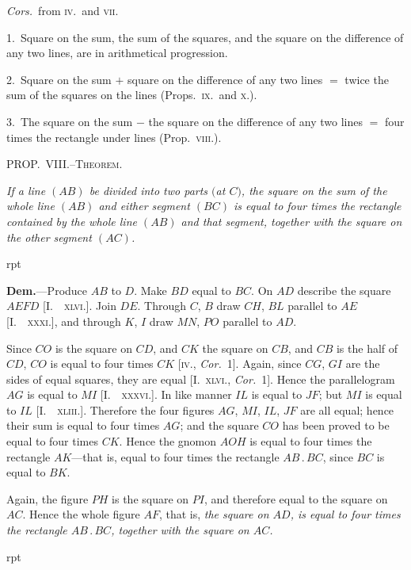 \documentclass[oneside]{book}
\newcounter{wrapwidth}
\newcommand\mypropl[2]{
\bigskip\Needspace*{4\baselineskip}\begin{center}\textsc{#1}\end{center}
\hspace{\parindent}\emph{#2}\par\medskip
}
\newcommand\imgflow[3]{
\setcounter{wrapwidth}{#1}

\begin{wrapfigure}[#2]{r}{\value{wrapwidth}pt}
\begin{center}
\vspace{-0.3in}

\end{center}
\end{wrapfigure}
}
\begin{document}
\textit{Cors.}\ from \textsc{iv}.\ and \textsc{vii}.

1.~Square on the sum, the sum of the squares, and
the square on the difference of any two lines, are in
arithmetical progression.

2.~Square on the sum $+$ square on the difference of
any two lines $=$ twice the sum of the squares on the
lines (Props.~\textsc{ix}.\ and \textsc{x}.).

3.~The square on the sum $-$ the square on the difference
of any two lines $=$ four times the rectangle under
lines (Prop.~\textsc{viii}.).



\mypropl{PROP\@.~VIII\@.--Theorem.}{If a line $(AB)$ be divided into two parts $($at $C)$, the
square on the sum of the whole line $(AB)$ and either segment
$(BC)$ is equal to four times the rectangle contained
by the whole line $(AB)$ and that segment, together with
the square on the other segment $(AC)$.}


\imgflow{110}{8}{f089}

\textbf{Dem.}---Produce $AB$ to $D$. Make $BD$ equal to $BC$.
On $AD$ describe the square $AEFD$
[I.~\textsc{~xlvi}.]. Join $DE$. Through
$C$, $B$ draw $CH$, $BL$ parallel to $AE$
[I.~\textsc{~xxxi}.], and through $K$, $I$ draw
$MN$, $PO$ parallel to $AD$.

Since $CO$ is the square on $CD$,
and $CK$ the square on $CB$, and
$CB$ is the half of $CD$, $CO$ is equal
to four times $CK$ [\textsc{iv.,} \textit{Cor.}~1].
Again, since $CG$, $GI$ are the sides of equal squares,
they are equal [I.~\textsc{xlvi.}, \textit{Cor.}~1]. Hence the parallelogram
$AG$ is equal to $MI$ [I.~\textsc{~xxxvi}.]. In like manner
$IL$ is equal to $JF$; but $MI$ is equal to $IL$ [I.~\textsc{~xliii}.].
Therefore the four figures $AG$, $MI$, $IL$, $JF$ are all
equal; hence their sum is equal to four times $AG$; and
the square $CO$ has been proved to be equal to four times
$CK$. Hence the gnomon $AOH$ is equal to four times
the rectangle $AK$---that is, equal to four times the
rectangle $AB\,.\,BC$, since $BC$ is equal to $BK$.

Again, the figure $PH$ is the square on $PI$, and
therefore equal to the square on $AC$. Hence the
whole figure $AF$, that is, \textit{the square on $AD$, is equal
to four times the rectangle $AB\,.\,BC$, together with the
square on $AC$.}\par\medskip


\imgflow{105}{9}{f090}
\end{document}
